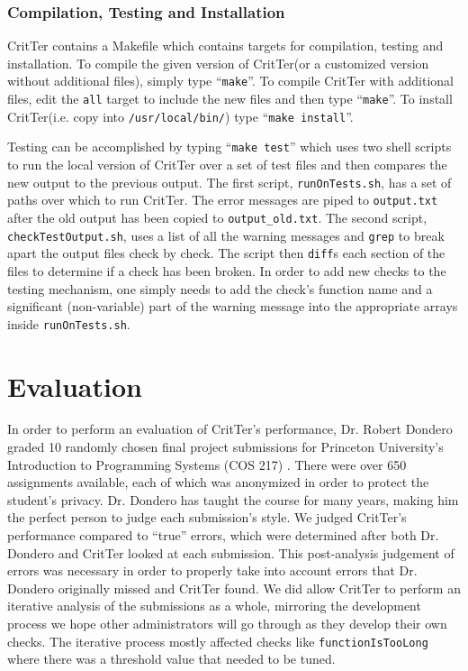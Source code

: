 \documentclass[12pt]{report}
\newcommand{\programName}{CritTer\xspace}
\begin{document}
\subsection{Compilation, Testing and Installation}

\programName contains a Makefile which contains targets for compilation, testing and installation. To 
compile the given version of \programName (or a customized version without additional files), simply 
type ``\lstinline{make}''. To compile \programName with additional files, edit the \lstinline{all} target to 
include the new files and then type ``\lstinline{make}''. To install \programName (i.e. copy into 
\lstinline{/usr/local/bin/}) type ``\lstinline{make install}''.

Testing can be accomplished by typing ``\lstinline{make test}'' which uses two shell scripts to run the 
local version of \programName over a set of test files and then compares the new output to the previous 
output. The first script, \lstinline{runOnTests.sh}, has a set of paths over which to run \programName. The 
error messages are piped to \lstinline{output.txt} after the old output has been copied to 
\lstinline{output_old.txt}. The second script, \lstinline{checkTestOutput.sh}, uses a list of all the warning 
messages and \lstinline{grep} to break apart the output files check by check. The script then 
\lstinline{diff}s each section of the files to determine if a check has been broken. In order to add new 
checks to the testing mechanism, one simply needs to add the check's function name and a significant 
(non-variable) part of the warning message into the appropriate arrays inside \lstinline{runOnTests.sh}.

\chapter{Evaluation}

\newcommand{\human}{Dr.\ Dondero\xspace}

In order to perform an evaluation of \programName's performance, Dr. Robert Dondero graded 
10 randomly chosen final project submissions for Princeton University's Introduction to Programming 
Systems (COS 217) \cite{cos217}. There were over 650 assignments available, each of which was 
anonymized in order to protect the student's privacy. Dr. Dondero has taught the course for many years, 
making him the perfect person to judge each submission's style. We judged \programName's 
performance compared to ``true'' errors, which were determined after both Dr. Dondero and 
\programName looked at each submission. This post-analysis judgement of errors was necessary in 
order to properly take into account errors that Dr. Dondero originally missed and  \programName found. 
We did allow \programName to perform an iterative analysis of the submissions as a whole, mirroring 
the development process we hope other administrators will go through as they develop their own 
checks. The iterative process mostly affected checks like \lstinline{functionIsTooLong} where there was a 
threshold value that needed to be tuned. 
\end{document}

